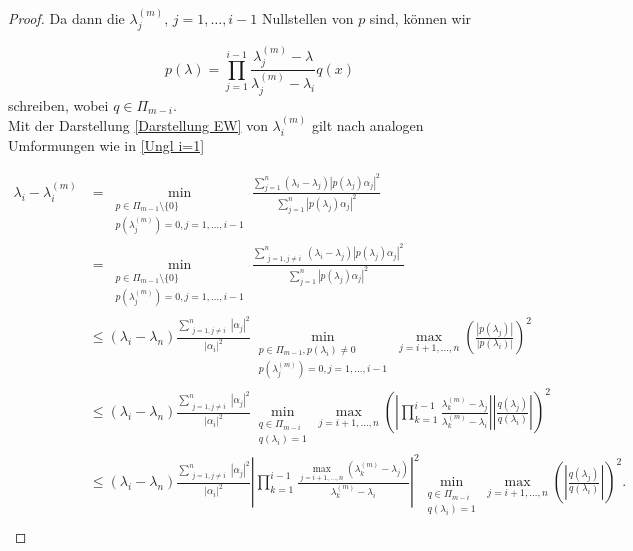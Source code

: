 \documentclass{article}
\begin{document}
\begin{theorem}
\begin{theorem}
\begin{proof}
	Da dann die $\lambda_j^{(m)}, \, j = 1,\dots,i-1$ Nullstellen von $p$ sind, können wir

	\begin{equation*}
		p(\lambda) = \prod_{j = 1}^{i-1} \frac{\lambda_j^{(m)} -\lambda}{\lambda_j^{(m)} - \lambda_i} q(x)
	\end{equation*}
	schreiben, wobei $q \in \Pi_{m-i}$.\\

	Mit der Darstellung \eqref{Darstellung EW} von $\lambda_i^{(m)}$ gilt nach analogen Umformungen wie in \eqref{Ungl i=1}

	\begin{equation*}
		\begin{aligned}
			\lambda_i - \lambda_i^{(m)} &= \min_{\substack{p\in \Pi_{m-1}\setminus \{0\} \\ p(\lambda_j^{(m)}) = 0, j = 1,\dots,i-1}} \frac{\sum_{j=1}^{n} (\lambda_i - \lambda_j)|p(\lambda_j)\alpha_j|^2}{\sum_{j=1}^{n} |p(\lambda_j)\alpha_j|^2} \\
			&= \min_{\substack{p\in \Pi_{m-1}\setminus \{0\} \\ p(\lambda_j^{(m)}) = 0, j = 1,\dots,i-1}} \frac{\sum_{\substack{j=1, j\neq i}}^{n} (\lambda_i - \lambda_j)|p(\lambda_j)\alpha_j|^2}{\sum_{j=1}^{n} |p(\lambda_j)\alpha_j|^2} \\
			& \le (\lambda_i - \lambda_n) \frac{\sum_{\substack{j=1, j\neq i}}^{n} |\alpha_j|^2}{|\alpha_i|^2} \min_{\substack{p\in \Pi_{m-1}, p(\lambda_i) \neq 0 \\ p(\lambda_j^{(m)}) = 0, j = 1,\dots,i-1}} \max_{j=i+1,\dots,n} \left(\frac{|p(\lambda_j)|}{|p(\lambda_i)|}\right)^2 \\
			&\le (\lambda_i - \lambda_n) \frac{\sum_{\substack{j=1, j\neq i}}^{n} |\alpha_j|^2}{|\alpha_i|^2} \min_{\substack{q\in \Pi_{m-i} \\ q(\lambda_i) = 1}} \max_{j=i+1,\dots,n} \left(\left|\prod_{k = 1}^{i-1} \frac{\lambda_k^{(m)} -\lambda_j}{\lambda_k^{(m)} - \lambda_i}\right| \left|\frac{q(\lambda_j)}{q(\lambda_i)}\right|\right)^2 \\
			&\le (\lambda_i - \lambda_n) \frac{\sum_{\substack{j=1, j\neq i}}^{n} |\alpha_j|^2}{|\alpha_i|^2} \left|\prod_{k = 1}^{i-1} \frac{\max_{j=i+1,\dots,n} (\lambda_k^{(m)} -\lambda_j)}{\lambda_k^{(m)} - \lambda_i}\right|^2 \min_{\substack{q\in \Pi_{m-i} \\ q(\lambda_i) = 1}} \max_{j=i+1,\dots,n} \left(\left|\frac{q(\lambda_j)}{q(\lambda_i)}\right|\right)^2. \\
		\end{aligned}
	\end{equation*}


\end{proof}
\end{theorem}
\end{theorem}
\end{document}
